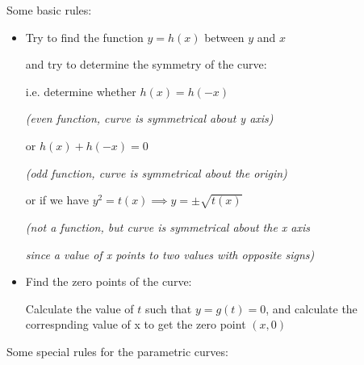 \documentclass[12pt]{report}
\begin{document}
\noindent Some basic rules:
\begin{itemize}
    \item Try to find the function $y = h(x)$ between $y$ and $x$
    
    and try to determine the symmetry of the curve: 
    
    i.e. determine whether $h(x) = h(-x)$ 
    
    \emph{(even function, curve is symmetrical about y axis)}

    or $h(x) + h(-x) = 0$ 
    
    \emph{(odd function, curve is symmetrical about the origin)}
    
    or if we have $y^{2} = t(x) \implies y = \pm \sqrt{t(x)}$

    \emph{(not a function, but curve is symmetrical about the x axis}

    \emph{since a value of x points to two values with opposite signs)}
    \item Find the zero points of the curve:
    
    Calculate the value of $t$ such that $y = g(t) = 0$, 
    and calculate the correspnding value of x 
    to get the zero point $(x, 0)$
\end{itemize}
Some special rules for the parametric curves:
\end{document}
